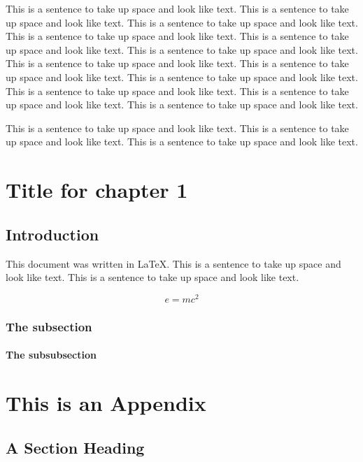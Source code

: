 \documentclass[chap,11pt,letterpaper]{rpithesis}
\begin{document}
This is a sentence to take up space and look like text. This is a sentence to take up space and look like text.
This is a sentence to take up space and look like text. This is a sentence to take up space and look like text.
This is a sentence to take up space and look like text. This is a sentence to take up space and look like text.
This is a sentence to take up space and look like text. This is a sentence to take up space and look like text.
This is a sentence to take up space and look like text. This is a sentence to take up space and look like text.
This is a sentence to take up space and look like text. This is a sentence to take up space and look like text.
 
This is a sentence to take up space and look like text. This is a sentence to take up space and look like text.
This is a sentence to take up space and look like text. 

\chapter{Title for chapter 1}

\section{Introduction}
This document was written in \LaTeX \cite{Latex}. This is a sentence to take up space and look like text. This is a sentence to take up space and look like text.

\begin{equation}\label{eq:einstein}
  e = mc^{2}
\end{equation}

\subsection{The subsection}
\lipsum

\subsubsection{The subsubsection}
\lipsum

 
 
\begin{singlespace}

\end{singlespace}

\appendix    
{} 
\chapter{This is an Appendix}
\lipsum

\section{A Section Heading}
\lipsum    
 
\end{document}
